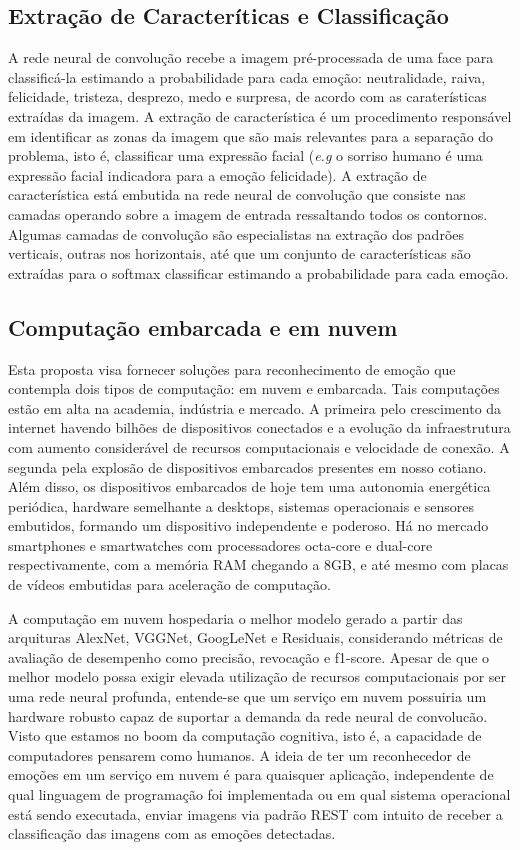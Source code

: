 \subsection{Extração de Caracteríticas e Classificação}
A rede neural de convolução recebe a imagem pré-processada de uma face para classificá-la estimando a probabilidade para cada emoção: neutralidade, raiva, felicidade, tristeza, desprezo, medo e surpresa, de acordo com as caraterísticas extraídas da imagem.  A extração de característica é um procedimento responsável em identificar as zonas da imagem que são mais relevantes para a separação do problema, isto é, classificar uma expressão facial (\textit{e.g} o sorriso humano é uma expressão facial indicadora para a emoção felicidade). A extração de característica está embutida na rede neural de convolução que consiste nas camadas operando sobre a imagem de entrada ressaltando todos os contornos. Algumas camadas de convolução são especialistas na extração dos padrões verticais, outras nos horizontais, até que um conjunto de características são extraídas para o softmax classificar estimando a probabilidade para cada emoção.


\subsection{Computação embarcada e em nuvem}
Esta proposta visa fornecer soluções para reconhecimento de emoção que contempla dois tipos de computação: em nuvem e embarcada. Tais computações estão em alta na academia, indústria e mercado. A primeira pelo crescimento da internet havendo bilhões de dispositivos conectados e a evolução da infraestrutura com aumento considerável de recursos computacionais e velocidade de conexão. A segunda pela explosão de dispositivos embarcados presentes em nosso cotiano. Além disso, os dispositivos embarcados de hoje tem uma autonomia energética periódica, hardware semelhante a desktops, sistemas operacionais e sensores embutidos, formando um dispositivo independente e poderoso. Há no mercado smartphones e smartwatches com processadores octa-core e dual-core respectivamente, com a memória RAM chegando a 8GB, e até mesmo com placas de vídeos embutidas para aceleração de computação.        

A computação em nuvem hospedaria o melhor modelo gerado a partir das arquituras AlexNet, VGGNet, GoogLeNet e Residuais, considerando métricas de avaliação de desempenho como precisão, revocação e f1-score. Apesar de que o melhor modelo possa exigir elevada utilização de recursos computacionais por ser uma rede neural profunda, entende-se que um serviço em nuvem possuiria um hardware robusto capaz de suportar a demanda da rede neural de convolucão. Visto que estamos no boom da computação cognitiva, isto é, a capacidade de computadores pensarem como humanos. A ideia de ter um reconhecedor de emoções em um serviço em nuvem é para quaisquer aplicação, independente de qual linguagem de programação foi implementada ou em qual sistema operacional está sendo executada, enviar imagens via padrão REST com intuito de receber a classificação das imagens com as emoções detectadas.    

